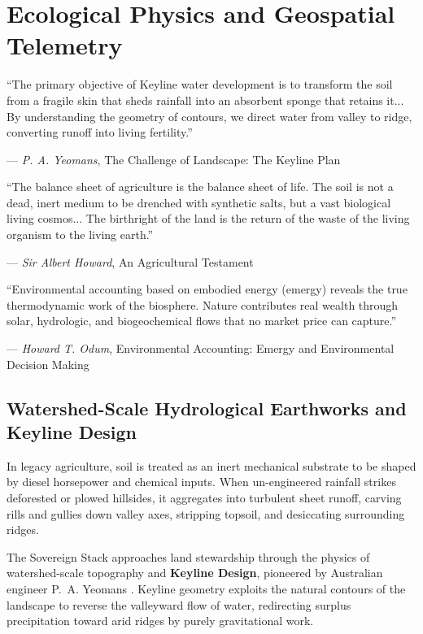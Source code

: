 \chapter{Ecological Physics and Geospatial Telemetry}
\label{chap:ecology_geospatial}

\epigraph{
    ``The primary objective of Keyline water development is to transform the soil from a fragile skin that sheds rainfall into an absorbent sponge that retains it... By understanding the geometry of contours, we direct water from valley to ridge, converting runoff into living fertility.''
}{--- \textit{P. A. Yeomans}, \textnormal{The Challenge of Landscape: The Keyline Plan} \cite{yeomans1958}}

\epigraph{
    ``The balance sheet of agriculture is the balance sheet of life. The soil is not a dead, inert medium to be drenched with synthetic salts, but a vast biological living cosmos... The birthright of the land is the return of the waste of the living organism to the living earth.''
}{--- \textit{Sir Albert Howard}, \textnormal{An Agricultural Testament} \cite{howard1943}}

\epigraph{
    ``Environmental accounting based on embodied energy (emergy) reveals the true thermodynamic work of the biosphere. Nature contributes real wealth through solar, hydrologic, and biogeochemical flows that no market price can capture.''
}{--- \textit{Howard T. Odum}, \textnormal{Environmental Accounting: Emergy and Environmental Decision Making} \cite{odum1996environmental}}

\section{Watershed-Scale Hydrological Earthworks and Keyline Design}
\label{sec:keyline_earthworks}

In legacy agriculture, soil is treated as an inert mechanical substrate to be shaped by diesel horsepower and chemical inputs. When un-engineered rainfall strikes deforested or plowed hillsides, it aggregates into turbulent sheet runoff, carving rills and gullies down valley axes, stripping topsoil, and desiccating surrounding ridges. 

The Sovereign Stack approaches land stewardship through the physics of watershed-scale topography and \textbf{Keyline Design}, pioneered by Australian engineer P.~A. Yeomans \cite{yeomans1958}. Keyline geometry exploits the natural contours of the landscape to reverse the valleyward flow of water, redirecting surplus precipitation toward arid ridges by purely gravitational work.

